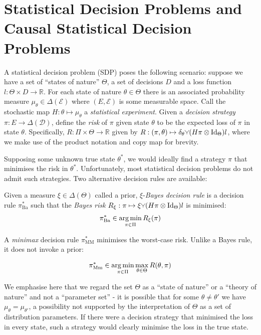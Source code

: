 
\section{Statistical Decision Problems and Causal Statistical Decision Problems}

A statistical decision problem (SDP) poses the following scenario: suppose we have a set of ``states of nature'' $\Theta$, a set of decisions $D$ and a loss function $l:\Theta\times D\to \mathbb{R}$. For each state of nature $\theta\in \Theta$ there is an associated probability measure $\mu_\theta\in \Delta(\mathcal{E})$ where $(E,\mathcal{E})$ is some measurable space. Call the stochastic map $H:\theta\mapsto \mu_\theta$ a \emph{statistical experiment}. Given a \emph{decision strategy} $\pi:E\to \Delta(\mathcal{D})$, define the \emph{risk} of $\pi$ given state $\theta$ to be the expected loss of $\pi$ in state $\theta$. Specifically, $R:\Pi\times \Theta\to \mathbb{R}$ given by $R:(\pi,\theta)\mapsto \delta_\theta \splitter{0.1}(H \pi\otimes \ID{\Theta}) l$, where we make use of the product notation and copy map for brevity.

Supposing some unknown true state $\theta^*$, we would ideally find a strategy $\pi$ that minimises the risk in $\theta^*$. Unfortunately, most statistical decision problems do not admit such strategies. Two alternative decision rules are available:

Given a measure $\xi\in \Delta(\Theta)$ called a prior, $\xi$-\emph{Bayes decision rule} is a decision rule $\pi^*_{\mathrm{Ba}}$ such that the \emph{Bayes risk} $R_\xi:\pi\mapsto \xi \splitter{0.1}(H\pi \otimes \ID{\Theta})l$ is minimised:
\begin{align}
    \pi^*_{\mathrm{Ba}}\in \operatorname*{arg\,min}_{\pi\in \Pi} R_\xi (\pi)
\end{align}

A \emph{minimax} decision rule $\pi^*_{\mathrm{MM}}$ minimises the worst-case risk. Unlike a Bayes rule, it does not invoke a prior:

\begin{align}
    \pi^*_{\mathrm{Mm}}\in \operatorname*{arg\,min}_{\pi\in \Pi} \max_{\theta\in \Theta} R(\theta,\pi)
\end{align}

We emphasise here that we regard the set $\Theta$ as a ``state of nature'' or a ``theory of nature'' and not a ``parameter set'' - it is possible that for some $\theta\neq \theta'$ we have $\mu_\theta=\mu_{\theta'}$, a possibility not supported by the interpretation of $\Theta$ as a set of distribution parameters. If there were a decision strategy that minimised the loss in every state, such a strategy would clearly minimise the loss in the true state. 

